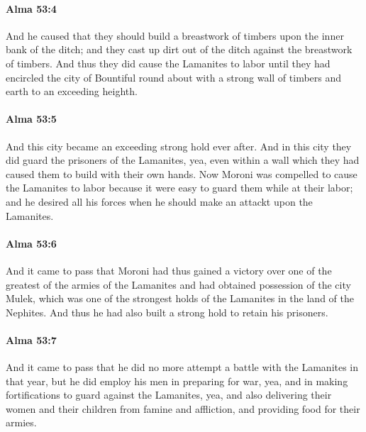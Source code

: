 		\paragraph{Alma 53:4} %
			\label{ALMA-53-4}

			And he caused that they should build a breastwork of timbers
			upon the inner bank of the ditch;
			and they cast up dirt out of the ditch against the breastwork of timbers.
			And thus they did cause the Lamanites to labor
			until they had encircled the city of Bountiful round about
			with a strong wall of timbers and earth to an exceeding heighth.

		\paragraph{Alma 53:5} %
			\label{ALMA-53-5}

			And this city became an exceeding strong hold ever after.
			And in this city they did guard the prisoners of the Lamanites,
			yea, even within a wall which they had caused them to build with their own hands.
			Now Moroni was compelled to cause the Lamanites to labor
			because it were easy to guard them while at their labor;
			and he desired all his forces when he should make an attackt upon the Lamanites.

		\paragraph{Alma 53:6} %
			\label{ALMA-53-6}

			And it came to pass that Moroni had thus gained a victory
			over one of the greatest of the armies of the Lamanites
			and had obtained possession of the city Mulek,
			which was one of the strongest holds of the Lamanites in the land of the Nephites.
			And thus he had also built a strong hold to retain his prisoners.

		\paragraph{Alma 53:7} %
			\label{ALMA-53-7}

			And it came to pass that
			he did no more attempt a battle with the Lamanites in that year,
			but he did employ his men in preparing for war,
			yea, and in making fortifications to guard against the Lamanites,
			yea, and also delivering their women and their children from famine and affliction,
			and providing food for their armies.

